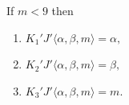 If $m < 9$ then
\begin{enumerate}
\item $K_1' J' \langle \alpha, \beta, m \rangle = \alpha,$
\item $K_2' J' \langle \alpha, \beta, m \rangle = \beta,$
\item $K_3' J' \langle \alpha, \beta, m \rangle = m.$
\end{enumerate}

